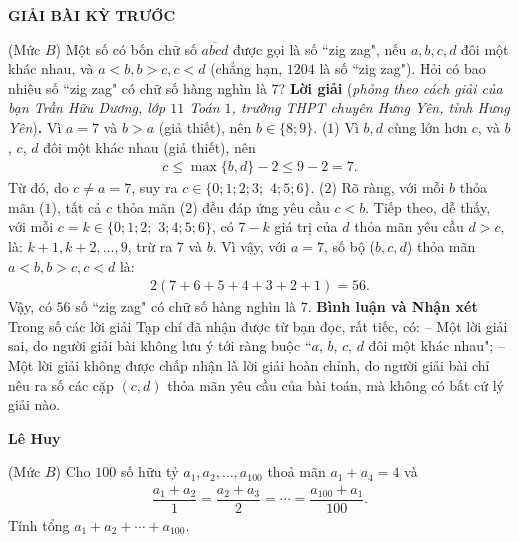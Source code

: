 \centerline{{\large{\textbf{\color{thachthuctoanhoc}GIẢI BÀI KỲ TRƯỚC}}}}
\vspace*{-5pt}
\begin{multicols}{2}
	\setlength{\abovedisplayskip}{4pt}
	\setlength{\belowdisplayskip}{4pt}
	{}
	(Mức $B$) Một số có bốn chữ số $\overline{a b c d}$ được gọi là số ``zig zag", nếu $a, b, c, d$ đôi một khác nhau, và $a<b, b>c, c<d$ (chẳng hạn, $1204$ là số ``zig zag"). Hỏi có bao nhiêu số ``zig zag" có chữ số hàng nghìn là $7$?
	\vskip 0.05cm
	\textbf{\color{thachthuctoanhoc}Lời giải} (\textit{phỏng theo cách giải của bạn Trần Hữu Dương, lớp $11$ Toán $1$, trường THPT chuyên Hưng Yên, tỉnh Hưng Yên})\textbf{\color{thachthuctoanhoc}.}
	Vì $a = 7$ và $b > a$ (giả thiết), nên $b \in \{8; 9\}$. \hfill ($1$)
	\vskip 0.05cm
	Vì $b, d$ cùng lớn hơn $c$, và $b$, $c$, $d$ đôi một khác nhau (giả thiết), nên
	\begin{align*}
		c \le \max\{b, d\} - 2 \le 9 - 2 = 7.
	\end{align*}
	Từ đó, do $c \ne a = 7$, suy ra $c \in \{0; 1; 2; 3;$ $4; 5; 6\}$. \hfill($2$)
	\vskip 0.05cm
	Rõ ràng, với mỗi $b$ thỏa mãn ($1$), tất cả $c$ thỏa mãn ($2$) đều đáp ứng yêu cầu $c < b$.
	\vskip 0.05cm
	Tiếp theo, dễ thấy, với mỗi $c = k \in \{0; 1; 2;$ $3; 4; 5; 6\}$, có $7 - k$ giá trị của $d$ thỏa mãn yêu cầu $d > c$, là: $k \!+\! 1, k \!+\! 2, \ldots, 9$, trừ ra $7$ và $b$.
	\vskip 0.05cm
	Vì vậy, với $a = 7$, số bộ ($b, c, d$) thỏa mãn $a < b, b > c, c < d$ là:
	\begin{align*}
		2(7 + 6 + 5 + 4 + 3 + 2 + 1) = 56.
	\end{align*}
	Vậy, có $56$ số ``zig zag" có chữ số hàng nghìn là $7$.
	\vskip 0.05cm
	\textbf{\color{thachthuctoanhoc}Bình luận và Nhận xét}
	\vskip 0.05cm	
	Trong số các lời giải Tạp chí đã nhận được từ bạn đọc, rất tiếc, có:
	\vskip 0.05cm
	-- Một lời giải sai, do người giải bài không lưu ý tới ràng buộc ``$a$, $b$, $c$, $d$ đôi một khác nhau";
	\vskip 0.05cm
	-- Một lời giải không được chấp nhận là lời giải hoàn chỉnh, do người giải bài chỉ nêu ra số các cặp $(c, d)$ thỏa mãn yêu cầu của bài toán, mà không có bất cứ lý giải nào.
	\begin{flushright}
		\textbf{\color{thachthuctoanhoc}Lê Huy}
	\end{flushright}
	{}
	(Mức $B$) Cho $100$ số hữu tỷ $a_1,a_2,\ldots,a_{100}$ thoả mãn $a_1+a_4=4$ và
	\begin{align*}
		\dfrac{a_1+a_2}1=\dfrac{a_2+a_3}2=\cdots=\dfrac{a_{100}+a_1}{100}.
	\end{align*}
	Tính tổng $a_1+ a_2 +\cdots+a_{100}$. 
	

\end{multicols}
